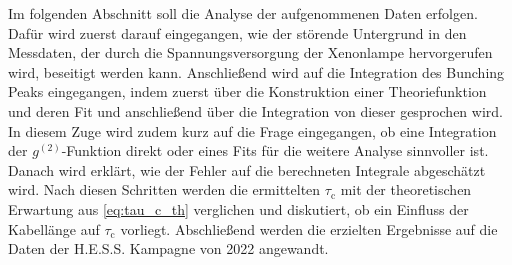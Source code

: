 Im folgenden Abschnitt soll die Analyse der aufgenommenen Daten erfolgen. 
Dafür wird zuerst darauf eingegangen, wie der störende Untergrund in den Messdaten, der durch die Spannungsversorgung der Xenonlampe hervorgerufen wird, beseitigt werden kann. 
Anschließend wird auf die Integration des Bunching Peaks eingegangen, indem zuerst über die Konstruktion einer Theoriefunktion und deren Fit und anschließend über die Integration von dieser gesprochen wird. 
In diesem Zuge wird zudem kurz auf die Frage eingegangen, ob eine Integration der $g^{(2)}$-Funktion direkt oder eines Fits für die weitere Analyse sinnvoller ist. 
Danach wird erklärt, wie der Fehler auf die berechneten Integrale abgeschätzt wird. 
Nach diesen Schritten werden die ermittelten $\tau_{\mathrm{c}}$ mit der theoretischen Erwartung aus \autoref{eq:tau_c_th} verglichen und diskutiert, ob ein Einfluss der Kabellänge auf $\tau_{\mathrm{c}}$ vorliegt. 
Abschließend werden die erzielten Ergebnisse auf die Daten der H.E.S.S. Kampagne von 2022 angewandt. 

